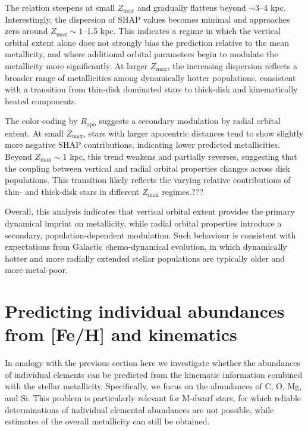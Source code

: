 \documentclass{aa}
\begin{document}
The relation steepens at small $Z_{\max}$ and gradually flattens beyond $\sim$3–4 kpc. Interestingly, the dispersion of SHAP values becomes minimal and approaches zero around $Z_{\max} \sim 1$–1.5 kpc. This indicates a regime in which the vertical orbital extent alone does not strongly bias the prediction relative to the mean metallicity, and where additional orbital parameters begin to modulate the metallicity more significantly. At larger $Z_{\max}$, the increasing dispersion reflects a broader range of metallicities among dynamically hotter populations, consistent with a transition from thin-disk dominated stars to thick-disk and kinematically heated components.

The color-coding by $R_{\mathrm{apo}}$ suggests a secondary modulation by radial orbital extent. At small $Z_{\max}$, stars with larger apocentric distances tend to show slightly more negative SHAP contributions, indicating lower predicted metallicities. Beyond $Z_{\max} \sim 1$ kpc, this trend weakens and partially reverses, suggesting that the coupling between vertical and radial orbital properties changes across disk populations. This transition likely reflects the varying relative contributions of thin- and thick-disk stars in different $Z_{\max}$ regimes.???

Overall, this analysis indicates that vertical orbital extent provides the primary dynamical imprint on metallicity, while radial orbital properties introduce a secondary, population-dependent modulation. Such behaviour is consistent with expectations from Galactic chemo-dynamical evolution, in which dynamically hotter and more radially extended stellar populations are typically older and more metal-poor.


\section{Predicting individual abundances from [Fe/H] and kinematics}

In analogy with the previous section here we investigate whether the abundances of individual elements can be predicted from the kinematic information combined with the stellar metallicity. Specifically, we focus on the abundances of C, O, Mg, and Si. This problem is particularly relevant for M-dwarf stars, for which reliable determinations of individual elemental abundances are not possible, while estimates of the overall metallicity can still be obtained.
\end{document}
